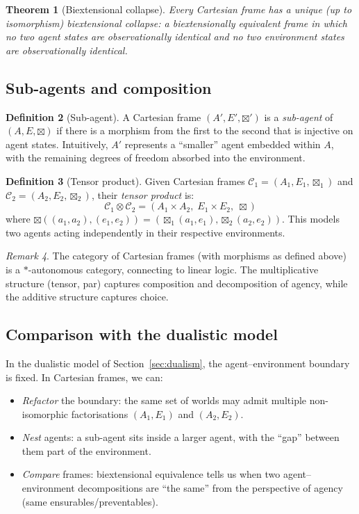 \documentclass[11pt,a4paper]{article}
\newtheorem{theorem}{Theorem}[section]
\theoremstyle{definition}
\newtheorem{definition}[theorem]{Definition}
\theoremstyle{remark}
\newtheorem{remark}[theorem]{Remark}
\begin{document}
\begin{theorem}[Biextensional collapse]
Every Cartesian frame has a unique (up to isomorphism) biextensional
collapse: a biextensionally equivalent frame in which no two agent states
are observationally identical and no two environment states are
observationally identical.
\end{theorem}

\subsection{Sub-agents and composition}

\begin{definition}[Sub-agent]
A Cartesian frame $(A', E', \boxtimes')$ is a \emph{sub-agent} of
$(A, E, \boxtimes)$ if there is a morphism from the first to the
second that is injective on agent states.  Intuitively, $A'$ represents
a ``smaller'' agent embedded within $A$, with the remaining degrees of
freedom absorbed into the environment.
\end{definition}

\begin{definition}[Tensor product]
Given Cartesian frames $\mathcal{C}_1 = (A_1, E_1, \boxtimes_1)$ and
$\mathcal{C}_2 = (A_2, E_2, \boxtimes_2)$, their \emph{tensor product}
is:
\[
  \mathcal{C}_1 \otimes \mathcal{C}_2 =
    (A_1 \times A_2,\; E_1 \times E_2,\; \boxtimes)
\]
where $\boxtimes((a_1, a_2), (e_1, e_2)) =
  (\boxtimes_1(a_1, e_1), \boxtimes_2(a_2, e_2))$.
This models two agents acting independently in their respective
environments.
\end{definition}

\begin{remark}
The category of Cartesian frames (with morphisms as defined above) is
a $*$-autonomous category, connecting to linear logic.  The
multiplicative structure (tensor, par) captures composition and
decomposition of agency, while the additive structure captures choice.
\end{remark}

\subsection{Comparison with the dualistic model}

In the dualistic model of Section~\ref{sec:dualism}, the agent--environment
boundary is fixed.  In Cartesian frames, we can:
\begin{itemize}
  \item \emph{Refactor} the boundary: the same set of worlds may admit
    multiple non-isomorphic factorisations $(A_1, E_1)$ and $(A_2, E_2)$.
  \item \emph{Nest} agents: a sub-agent sits inside a larger agent,
    with the ``gap'' between them part of the environment.
  \item \emph{Compare} frames: biextensional equivalence tells us when
    two agent--environment decompositions are ``the same'' from the
    perspective of agency (same ensurables/preventables).
\end{itemize}
\end{document}
